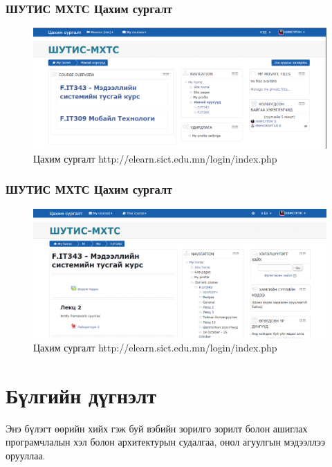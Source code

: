		\newpage
		\subsubsection{ШУТИС МХТС Цахим сургалт}
		\begin{figure}
			\centering
			\includegraphics[scale=0.5]{Diagrams/Sudalgaa2}
			\caption[Цахим сургалт http://elearn.sict.edu.mn/login/index.php]{Цахим сургалт http://elearn.sict.edu.mn/login/index.php}
			\label{text}
		\end{figure}
		
			\newpage
		\subsubsection{ШУТИС МХТС Цахим сургалт}
		\begin{figure}
			\centering
			\includegraphics[scale=0.5]{Diagrams/Sudalgaa3}
			\caption[Цахим сургалт http://elearn.sict.edu.mn/login/index.php]{Цахим сургалт http://elearn.sict.edu.mn/login/index.php}
			\label{text}
		\end{figure}
\section{Бүлгийн дүгнэлт}

	Энэ бүлэгт өөрийн хийх гэж буй вэбийн зорилго зорилт болон ашиглах програмчлалын хэл болон архитектурын судалгаа, онол агуулгын мэдээллээ орууллаа.
